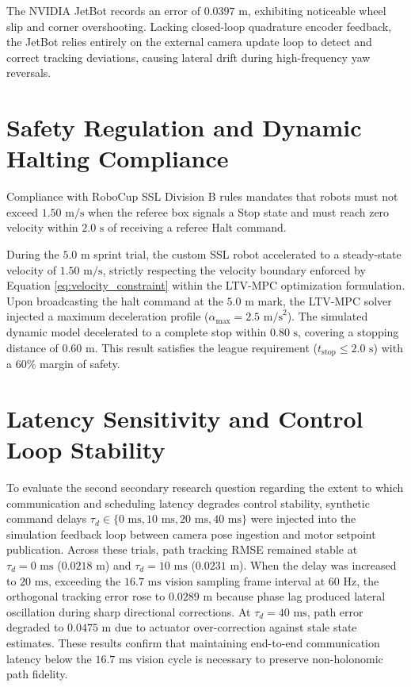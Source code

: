 \documentclass[a4paper,twoside,12pt]{report}
\begin{document}
The NVIDIA JetBot records an error of $0.0397\text{ m}$, exhibiting noticeable wheel slip and corner overshooting. Lacking closed-loop quadrature encoder feedback, the JetBot relies entirely on the external camera update loop to detect and correct tracking deviations, causing lateral drift during high-frequency yaw reversals.

\section{Safety Regulation and Dynamic Halting Compliance}

Compliance with RoboCup SSL Division B rules mandates that robots must not exceed $1.50\text{ m/s}$ when the referee box signals a Stop state and must reach zero velocity within $2.0\text{ s}$ of receiving a referee Halt command.

During the $5.0\text{ m}$ sprint trial, the custom SSL robot accelerated to a steady-state velocity of $1.50\text{ m/s}$, strictly respecting the velocity boundary enforced by Equation \ref{eq:velocity_constraint} within the LTV-MPC optimization formulation. Upon broadcasting the halt command at the $5.0\text{ m}$ mark, the LTV-MPC solver injected a maximum deceleration profile ($\alpha_{\text{max}} = 2.5\text{ m/s}^2$). The simulated dynamic model decelerated to a complete stop within $0.80\text{ s}$, covering a stopping distance of $0.60\text{ m}$. This result satisfies the league requirement ($t_{\text{stop}} \le 2.0\text{ s}$) with a $60\%$ margin of safety.

\section{Latency Sensitivity and Control Loop Stability}

To evaluate the second secondary research question regarding the extent to which communication and scheduling latency degrades control stability, synthetic command delays $\tau_d \in \{0\text{ ms}, 10\text{ ms}, 20\text{ ms}, 40\text{ ms}\}$ were injected into the simulation feedback loop between camera pose ingestion and motor setpoint publication. Across these trials, path tracking RMSE remained stable at $\tau_d = 0\text{ ms}$ ($0.0218\text{ m}$) and $\tau_d = 10\text{ ms}$ ($0.0231\text{ m}$). When the delay was increased to $20\text{ ms}$, exceeding the $16.7\text{ ms}$ vision sampling frame interval at $60\text{ Hz}$, the orthogonal tracking error rose to $0.0289\text{ m}$ because phase lag produced lateral oscillation during sharp directional corrections. At $\tau_d = 40\text{ ms}$, path error degraded to $0.0475\text{ m}$ due to actuator over-correction against stale state estimates. These results confirm that maintaining end-to-end communication latency below the $16.7\text{ ms}$ vision cycle is necessary to preserve non-holonomic path fidelity.
\end{document}
